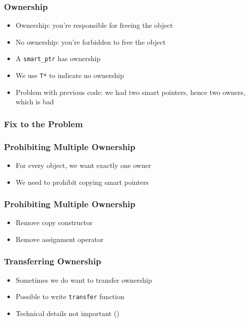\begin{frame}
  \frametitle{Ownership}
  \begin{itemize}
    \item Ownership: you're responsible for freeing the object
    \item No ownership: you're forbidden to free the object
    \item A {\tt smart\_ptr} has ownership
    \item We use {\tt T*} to indicate no ownership
    \item Problem with previous code: we had two smart pointers, hence two owners, which is bad
  \end{itemize}
\end{frame}

\begin{frame}
  \frametitle{Fix to the Problem}
\end{frame}

\begin{frame}
  \frametitle{Prohibiting Multiple Ownership}
  \begin{itemize}
    \item For every object, we want exactly one owner
    \item We need to prohibit copying smart pointers
  \end{itemize}
\end{frame}

\begin{frame}
  \frametitle{Prohibiting Multiple Ownership}
  \begin{itemize}
    \item Remove copy constructor
    \item Remove assignment operator
  \end{itemize}
\end{frame}

\begin{frame}
  \frametitle{Transferring Ownership}
  \begin{itemize}
    \item Sometimes we do want to transfer ownership
    \item Possible to write {\tt transfer} function
    \item Technical details not important ()
  \end{itemize}
\end{frame}

